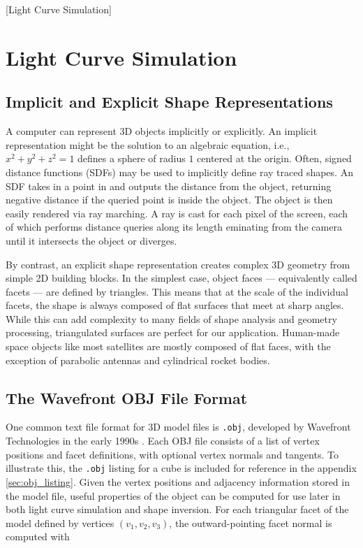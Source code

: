 [Light Curve Simulation]
\graphicspath{{/Users/liamrobinson/Documents/PyLightCurves/docs/build/html/_images}}

\chapter{Light Curve Simulation}

\section{Implicit and Explicit Shape Representations}

A computer can represent 3D objects implicitly or explicitly. An implicit representation might be the solution to an algebraic equation, i.e., $x^2 + y^2 + z^2 = 1$ defines a sphere of radius $1$ centered at the origin. Often, signed distance functions (SDFs) may be used to implicitly define ray traced shapes. An SDF takes in a point in \rthree and outputs the distance from the object, returning negative distance if the queried point is inside the object. The object is then easily rendered via ray marching. A ray is cast for each pixel of the screen, each of which performs distance queries along its length eminating from the camera until it intersects the object or diverges. 

By contrast, an explicit shape representation creates complex 3D geometry from simple 2D building blocks. In the simplest case, object faces --- equivalently called facets --- are defined by triangles. This means that at the scale of the individual facets, the shape is always composed of flat surfaces that meet at sharp angles. While this can add complexity to many fields of shape analysis and geometry processing, triangulated surfaces are perfect for our application. Human-made space objects like most satellites are mostly composed of flat faces, with the exception of parabolic antennas and cylindrical rocket bodies.

\section{The Wavefront OBJ File Format}

One common text file format for 3D model files is \texttt{.obj}, developed by Wavefront Technologies in the early 1990s \cite{obj_format}. Each OBJ file consists of a list of vertex positions and facet definitions, with optional vertex normals and tangents. To illustrate this, the \texttt{.obj} listing for a cube is included for reference in the appendix \ref{sec:obj_listing}. Given the vertex positions and adjacency information stored in the model file, useful properties of the object can be computed for use later in both light curve simulation and shape inversion. For each triangular facet of the model defined by vertices $\left(v_1, v_2, v_3\right)$, the outward-pointing facet normal is computed with

